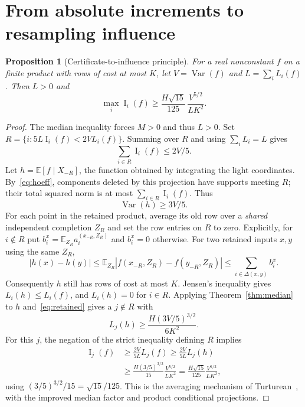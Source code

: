 \documentclass[11pt]{article}
\numberwithin{equation}{section}
\newtheorem{proposition}[theorem]{Proposition}
\theoremstyle{remark}
\newcommand{\E}{\mathbb E}
\newcommand{\Var}{\operatorname{Var}}
\newcommand{\Inf}{\operatorname{I}}
\newcommand{\delt}{\Delta}
\begin{document}
\section{From absolute increments to resampling influence}\label{sec:average}
\begin{proposition}[Certificate-to-influence principle]\label{prop:principle}
For a real nonconstant $f$ on a finite product with rows of cost at most $K$, let $V=\Var(f)$ and $L=\sum_iL_i(f)$. Then $L>0$ and
\begin{equation}\label{eq:principle}
 \max_i\Inf_i(f)\ge \frac{H\sqrt{15}}{125}\,
 \frac{V^{5/2}}{LK^2}.
\end{equation}
\end{proposition}
\begin{proof}
The median inequality forces $M>0$ and thus $L>0$. Set
$R=\{i:5L\Inf_i(f)<2VL_i(f)\}$. Summing over $R$ and using $\sum_iL_i=L$ gives
\begin{equation}\label{eq:light}
 \sum_{i\in R}\Inf_i(f)\le2V/5.
\end{equation}
Let $h=\E[f\mid X_{-R}]$, the function obtained by integrating the light coordinates. By~\eqref{eq:hoeff}, components deleted by this projection have supports meeting $R$; their total squared norm is at most $\sum_{i\in R}\Inf_i(f)$. Thus
\begin{equation}\label{eq:retained}
 \Var(h)\ge3V/5.
\end{equation}
For each point in the retained product, average its old row over a \emph{shared} independent completion $Z_R$ and set the row entries on $R$ to zero. Explicitly, for $i\notin R$ put
$b_i^x=\E_{Z_R}a_i^{(x_{-R},Z_R)}$ and $b_i^x=0$ otherwise. For two retained inputs $x,y$ using the same $Z_R$,
\[
 |h(x)-h(y)|\le\E_{Z_R}|f(x_{-R},Z_R)-f(y_{-R},Z_R)|
 \le\sum_{i\in\delt(x,y)}b_i^x.
\]
Consequently $h$ still has rows of cost at most $K$. Jensen's inequality gives
$L_i(h)\le L_i(f)$, and $L_i(h)=0$ for $i\in R$. Applying Theorem~\ref{thm:median} to $h$ and~\eqref{eq:retained} gives a $j\notin R$ with
\[
 L_j(h)\ge\frac{H(3V/5)^{3/2}}{6K^2}.
\]
For this $j$, the negation of the strict inequality defining $R$ implies
\begin{align*}
 \Inf_j(f)&\ge\frac{2V}{5L}L_j(f)
 \ge\frac{2V}{5L}L_j(h)\\
 &\ge\frac{H(3/5)^{3/2}}{15}\frac{V^{5/2}}{LK^2}
 =\frac{H\sqrt{15}}{125}\frac{V^{5/2}}{LK^2},
\end{align*}
using $(3/5)^{3/2}/15=\sqrt{15}/125$. This is the averaging mechanism of Turturean~\cite[Theorem~8.3]{Tur26}, with the improved median factor and product conditional projections.
\end{proof}
\end{document}
